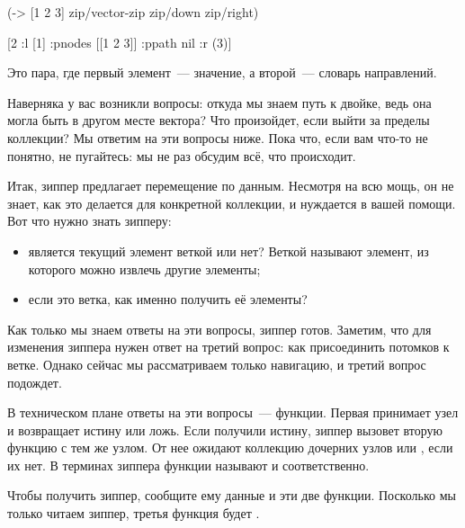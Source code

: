 \begin{english}
  \begin{clojure}
(-> [1 2 3]
    zip/vector-zip
    zip/down
    zip/right)

[2 {:l [1]
    :pnodes [[1 2 3]]
    :ppath nil
    :r (3)}]
  \end{clojure}
\end{english}

Это пара, где первый элемент~--- значение, а второй~--- словарь направлений.

Наверняка у вас возникли вопросы: откуда мы знаем путь к двойке, ведь она могла
быть в другом месте вектора? Что произойдет, если выйти за пределы коллекции?
Мы ответим на эти вопросы ниже. Пока что, если вам что-то не понятно, не
пугайтесь: мы не раз обсудим всё, что происходит.

Итак, зиппер предлагает перемещение по данным. Несмотря на всю мощь, он не
знает, как это делается для конкретной коллекции, и нуждается в вашей
помощи. Вот что нужно знать зипперу:

\begin{itemize}

\item
  является текущий элемент веткой или нет? Веткой называют элемент, из
  которого можно извлечь другие элементы;

\item
  если это ветка, как именно получить её элементы?

\end{itemize}

\pagebreaklarge

Как только мы знаем ответы на эти вопросы, зиппер готов. Заметим, что для
изменения зиппера нужен ответ на третий вопрос: как присоединить потомков к
ветке. Однако сейчас мы рассматриваем только навигацию, и третий вопрос
подождет.


В техническом плане ответы на эти вопросы~--- функции. Первая принимает узел и
возвращает истину или ложь. Если получили истину, зиппер вызовет вторую функцию
с тем же узлом. От нее ожидают коллекцию дочерних узлов или , если их
нет. В терминах зиппера функции называют  и 
соответственно.

Чтобы получить зиппер, сообщите ему данные и эти две функции. Посколько мы
только читаем зиппер, третья функция будет .

\def\urlclojurezip{https://github.com/clojure/clojure/blob/master/src/clj/clojure/zip.clj}

